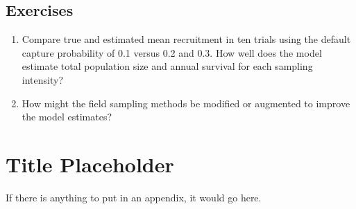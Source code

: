 \documentclass[
]{krantz}
\begin{document}
\hypertarget{exercises-8}{%
\section{Exercises}\label{exercises-8}}

\begin{enumerate}
\def\labelenumi{\arabic{enumi}.}
\item
  Compare true and estimated mean recruitment in ten trials using the default capture probability of 0.1 versus 0.2 and 0.3. How well does the model estimate total population size and annual survival for each sampling intensity?
\item
  How might the field sampling methods be modified or augmented to improve the model estimates?
\end{enumerate}

\cleardoublepage

\hypertarget{appendix-appendix}{%
\appendix {}}


\hypertarget{title-placeholder}{%
\chapter{Title Placeholder}\label{title-placeholder}}

If there is anything to put in an appendix, it would go here.

  

\backmatter
\printindex
\end{document}
